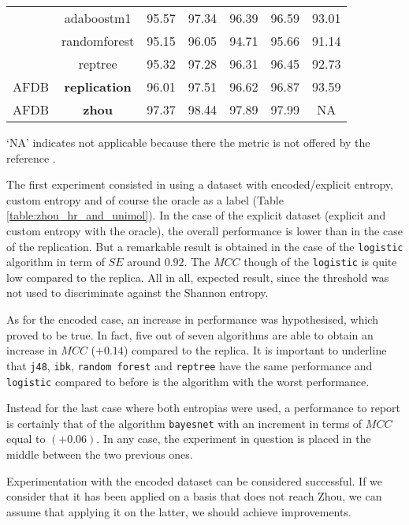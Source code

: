 \begin{table}[h]
\begin{center}
\begin{threeparttable}
\begin{tabular}{c c c c c c c}
  & adaboostm1 & 95.57 & 97.34 & 96.39 & 96.59 & 93.01 \\
  & randomforest & 95.15 & 96.05 & 94.71 & 95.66 & 91.14 \\
  & reptree & 95.32 & 97.28 & 96.31 & 96.45 & 92.73 \\
  \hline
  AFDB & \textbf{replication} & 96.01 & 97.51 & 96.62 & 96.87 & 93.59 \\
  \hline
  AFDB & \textbf{zhou} & 97.37 & 98.44 & 97.89 & 97.99 & NA \\
  \bottomrule
\end{tabular}
\begin{tablenotes}
 	\item ‘NA’ indicates not applicable because there the metric is not offered by the reference \cite{zhou2015}.
    \end{tablenotes}
\end{threeparttable}
\end{center}
\end{table}

The first experiment consisted in using a dataset with encoded/explicit entropy, custom entropy and of course the oracle as a label (Table \ref{table:zhou_hr_and_unimol}). In the case of the explicit dataset (explicit and custom entropy with the oracle), the overall performance is lower than in the case of the replication. But a remarkable result is obtained in the case of the \verb|logistic| algorithm in term of $SE$ around $0.92$. The $MCC$ though of the \verb|logistic| is quite low compared to the replica. All in all, expected result, since the threshold was not used to discriminate against the Shannon entropy. 

As for the encoded case, an increase in performance was hypothesised, which proved to be true. In fact, five out of seven algorithms are able to obtain an increase in $MCC$ ($+0.14$) compared to the replica. It is important to underline that \verb|j48|, \verb|ibk|, \verb|random forest| and \verb|reptree| have the same performance and \verb|logistic| compared to before is the algorithm with the worst performance.

Instead for the last case where both entropias were used, a performance to report is certainly that of the algorithm \verb|bayesnet| with an increment in terms of $MCC$ equal to $(+0.06)$. In any case, the experiment in question is placed in the middle between the two previous ones.

Experimentation with the encoded dataset can be considered successful. If we consider that it has been applied on a basis that does not reach Zhou, we can assume that applying it on the latter, we should achieve improvements.

